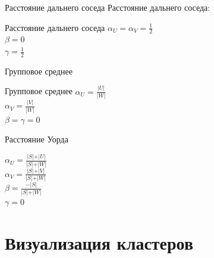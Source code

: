 \documentclass[10pt]{beamer}
\begin{document}
\begin{frame}{Расстояние дальнего соседа}
	Расстояние дальнего соседа:\\
\end{frame}

\begin{frame}{Расстояние дальнего соседа}
	${\alpha_U = \alpha_V = \frac{1}{2}}$ \\${\beta = 0}$ \\${\gamma = \frac{1}{2}}$
\end{frame}

\begin{frame}{Групповое среднее}
\end{frame}

\begin{frame}{Групповое среднее}
	${\alpha_U = \frac{\vert U \vert}{\vert W \vert}}$\\${\alpha_V = \frac{\vert V \vert}{\vert W \vert}}$ \\${\beta = \gamma = 0}$
\end{frame}

\begin{frame}{Расстояние Уорда}

  ${\alpha_U = \frac{\vert S \vert + \vert U \vert}{\vert S \vert + \vert W \vert}}$\\${\alpha_V = \frac{\vert S \vert + \vert V \vert}{\vert S \vert + \vert W \vert}}$ \\${\beta = \frac{ -\vert S \vert}{\vert S \vert + \vert W \vert}}$ \\${\gamma = 0}$
\end{frame}

\section{Визуализация кластеров}
\end{document}
